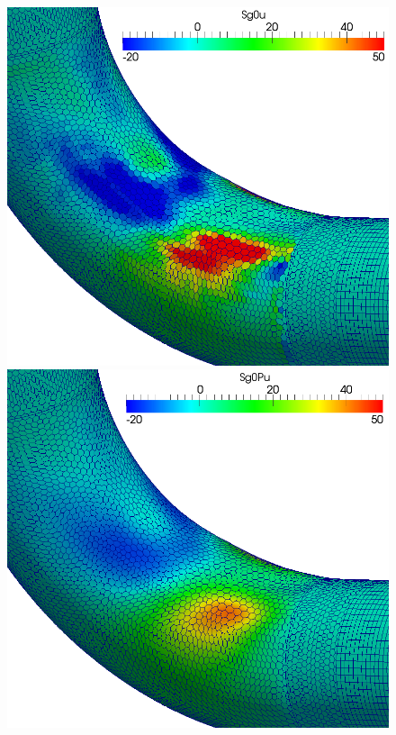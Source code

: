 \documentclass[8pt]{beamer}
\begin{document}
{\begin{figure}[htbp]
    \includegraphics[scale=0.1]{TOR_LB0.png} 
    \includegraphics[scale=0.1]{TOR_LB1.png}  
    \\
    \begin{minipage}[b]{3.9 cm}
\begin{footnotesize}
\begin{eqnarray*}

\end{eqnarray*}
\end{footnotesize}
\end{minipage}
\end{figure}}
\end{document}
